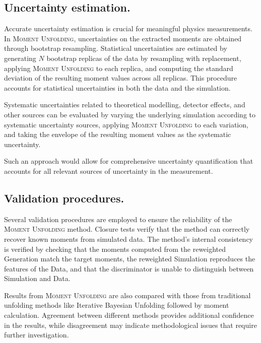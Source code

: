    \subsection{Uncertainty estimation.}
        Accurate uncertainty estimation is crucial for meaningful physics measurements.
        In \textsc{Moment Unfolding}, uncertainties on the extracted moments are obtained through bootstrap resampling.
        Statistical uncertainties are estimated by generating $N$ bootstrap replicas of the data by resampling with replacement,
        applying \textsc{Moment Unfolding} to each replica, and
        computing the standard deviation of the resulting moment values across all replicas.
        This procedure accounts for statistical uncertainties in both the data and the simulation.
        
        Systematic uncertainties related to theoretical modelling, detector effects, and other sources can be evaluated by
        varying the underlying simulation according to systematic uncertainty sources, applying \textsc{Moment Unfolding} to each variation, and
        taking the envelope of the resulting moment values as the systematic uncertainty.

        Such an approach would allow for comprehensive uncertainty quantification that accounts for all relevant sources of uncertainty in the measurement.
    \subsection{Validation procedures.}
        Several validation procedures are employed to ensure the reliability of the \textsc{Moment Unfolding} method.
        Closure tests verify that the method can correctly recover known moments from simulated data.
        The method's internal consistency is verified by checking that the moments computed from the reweighted Generation match the target moments,
        the reweighted Simulation reproduces the features of the Data, and
        that the discriminator is unable to distinguish between Simulation and Data.
        
        Results from \textsc{Moment Unfolding} are also compared with those from traditional unfolding methods like Iterative Bayesian Unfolding followed by moment calculation.
        Agreement between different methods provides additional confidence in the results, while disagreement may indicate methodological issues that require further investigation.
